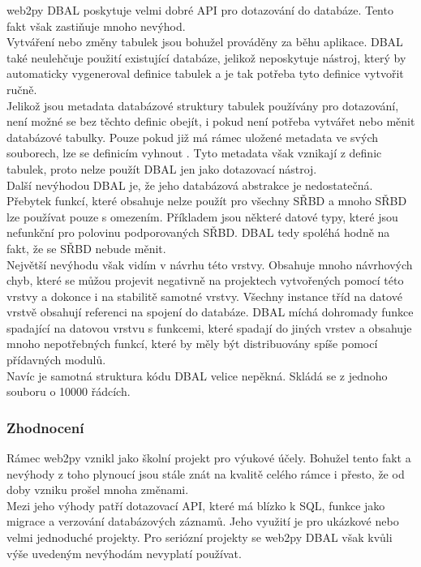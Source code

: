 \documentclass[ing,male,java,dept456]{diploma}						%
\begin{document}
web2py DBAL poskytuje velmi dobré API pro dotazování do databáze. Tento fakt však zastiňuje mnoho nevýhod. \\
Vytváření nebo změny tabulek jsou bohužel prováděny za běhu aplikace. DBAL také neulehčuje použití existující databáze, jelikož neposkytuje nástroj, který by automaticky vygeneroval definice tabulek a je tak potřeba tyto definice vytvořit ručně. \\
Jelikož jsou metadata databázové struktury tabulek používány pro dotazování, není možné se bez těchto definic obejít, i pokud není potřeba vytvářet nebo měnit databázové tabulky. Pouze pokud již má rámec uložené metadata ve svých souborech, lze se definicím vyhnout \cite{web2py-dal}. Tyto metadata však vznikají z definic tabulek, proto nelze použít DBAL jen jako dotazovací nástroj. \\
Další nevýhodou DBAL je, že jeho databázová abstrakce je nedostatečná. Přebytek funkcí, které obsahuje nelze použít pro všechny SŘBD a mnoho SŘBD lze používat pouze s omezením. Příkladem jsou některé datové typy, které jsou nefunkční pro polovinu podporovaných SŘBD. DBAL tedy spoléhá hodně na fakt, že se SŘBD nebude měnit. \\
Největší nevýhodu však vidím v návrhu této vrstvy. Obsahuje mnoho návrhových chyb, které se můžou projevit negativně na projektech vytvořených pomocí této vrstvy a dokonce i na stabilitě samotné vrstvy. Všechny instance tříd na datové vrstvě obsahují referenci na spojení do databáze. DBAL míchá dohromady funkce spadající na datovou vrstvu s funkcemi, které spadají do jiných vrstev a obsahuje mnoho nepotřebných funkcí, které by měly být distribuovány spíše pomocí přídavných modulů. \\
Navíc je samotná struktura kódu DBAL velice nepěkná. Skládá se z jednoho souboru o 10000 řádcích.

\subsubsection{Zhodnocení}

Rámec web2py vznikl jako školní projekt pro výukové účely. Bohužel tento fakt a nevýhody z toho plynoucí jsou stále znát na kvalitě celého rámce i přesto, že od doby vzniku prošel mnoha změnami. \\
Mezi jeho výhody patří dotazovací API, které má blízko k SQL, funkce jako migrace a verzování databázových záznamů. Jeho využití je pro ukázkové nebo velmi jednoduché projekty. Pro seriózní projekty se web2py DBAL však kvůli výše uvedeným nevýhodám nevyplatí používat. 
\end{document}
